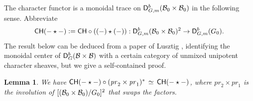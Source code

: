 \documentclass[a4paper,10pt,leqno]{amsart}
\theoremstyle{plain}
\theoremstyle{plain}
\theoremstyle{plain}
\newtheorem{lem}[thm]{Lemma}
\theoremstyle{definition}
\theoremstyle{remark}
\renewcommand{\pr}{\mathit{pr}}
\begin{document}
The character functor is a monoidal trace on $\sf{D}_{G, m}^b(\cal{B}_0 \times \cal{B}_0)$ in the following sense.
Abbreviate
\begin{align}
\sf{CH}(- \star -) \vcentcolon= \sf{CH} \circ ((-) \star (-)) : \sf{D}_{G, m}^b(\cal{B}_0 \times \cal{B}_0)^2 \to \sf{D}_{G, m}^b(G_0).
\end{align}
The result below can be deduced from a paper of Lusztig \cite{lusztig_2015}, identifying the monoidal center of $\sf{D}_G^b(\cal{B} \times \cal{B})$ with a certain category of unmixed unipotent character sheaves, but we give a self-contained proof.

\begin{lem}\label{lem:monoidal-trace}
We have ${\sf{CH}(- \star -) \circ (\pr_2 \times \pr_1)^\ast}\, \simeq \,{\sf{CH}(- \star -)}$, where $\pr_2 \times \pr_1$ is the involution of $[(\cal{B}_0 \times \cal{B}_0)/G_0]^2$ that swaps the factors.
\end{lem}
\end{document}
